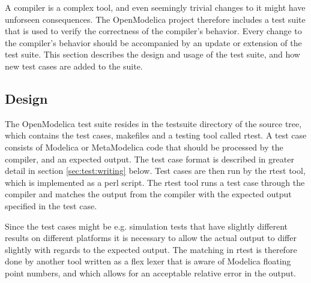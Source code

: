 A compiler is a complex tool, and even seemingly trivial changes to it might
have unforseen consequences. The OpenModelica project therefore includes a test
suite that is used to verify the correctness of the compiler's behavior. Every
change to the compiler's behavior should be accompanied by an update or extension
of the test suite. This section describes the design and usage of the test
suite, and how new test cases are added to the suite.

\subsection{Design}
\label{sec:test:design}
The OpenModelica test suite resides in the testsuite directory of the source
tree, which contains the test cases, makefiles and a testing tool called rtest.
A test case consists of Modelica or MetaModelica code that should be processed
by the compiler, and an expected output. The test case format is described in
greater detail in section \ref{sec:test:writing} below. Test cases are then run
by the rtest tool, which is implemented as a perl script. The rtest tool runs a
test case through the compiler and matches the output from the compiler with
the expected output specified in the test case.

Since the test cases might be e.g. simulation tests that have slightly different
results on different platforms it is necessary to allow the actual output to
differ slightly with regards to the expected output. The matching in rtest is
therefore done by another tool written as a flex lexer that is aware of Modelica
floating point numbers, and which allows for an acceptable relative error in the
output.

